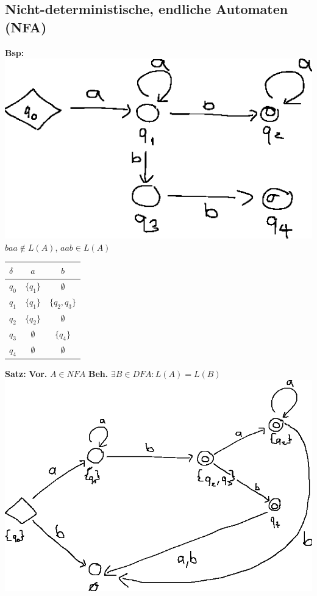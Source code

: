 \documentclass[10pt]{article}
\newcommand{\Bold}[1]{\textbf{#1}} %
\begin{document}
\subsection{Nicht-deterministische, endliche Automaten (NFA)}
\Bold{Bsp:}\\
\includegraphics{Bild5.eps}\\
$baa\notin L(A)$, $aab\in L(A)$\\
\begin{tabular}{l|c|c}
 $\delta$&$a$&$b$\\\hline
 $q_0$&$\{q_1\}$&$\emptyset$\\
 $q_1$&$\{q_1\}$&$\{q_2,q_3\}$\\
 $q_2$&$\{q_2\}$&$\emptyset$\\
 $q_3$&$\emptyset$&$\{q_4\}$\\
 $q_4$&$\emptyset$&$\emptyset$
\end{tabular}
\Bold{Satz:} \Bold{Vor.} $A\in NFA$ \Bold{Beh.} $\exists B\in DFA:L(A)=L(B)$\\
\includegraphics{Bild6.eps}\\
\end{document}
